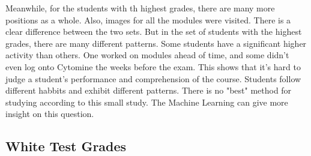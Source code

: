 \documentclass[a4paper,11pt]{report}
\numberwithin{figure}{section} %
\begin{document}
    Meanwhile, for the students with th highest grades, there are many more positions as a whole.
    Also, images for all the modules were visited.
    There is a clear difference between the two sets.
    But in the set of students with the highest grades, there are many different patterns.
    Some students have a significant higher activity than others.
    One worked on modules ahead of time, and some didn't even log onto Cytomine the weeks before the exam.
    This shows that it's hard to judge a student's performance and comprehension of the course.
    Students follow different habbits and exhibit different patterns.
    There is no "best" method for studying according to this small study.
    The Machine Learning can give more insight on this question.



    \subsection{White Test Grades}
\end{document}
